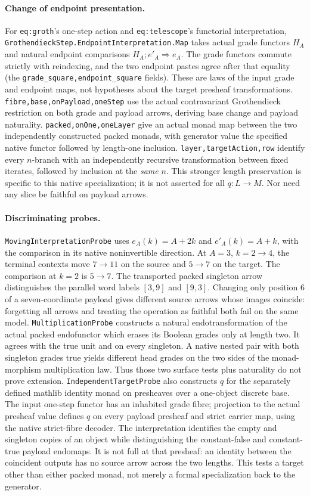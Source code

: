\paragraph{Change of endpoint presentation.}
For \texttt{eq:groth}'s one-step action and \texttt{eq:telescope}'s
functorial interpretation, \texttt{GrothendieckStep.EndpointInterpretation.Map}
takes actual grade functors $H_A$ and natural endpoint comparisons
$H_A;e'_A\Rightarrow e_A$. The grade functors commute strictly with
reindexing, and the two endpoint pastes agree after that equality
(the \texttt{grade\_square,endpoint\_square} fields). These are laws
of the input grade and endpoint maps, not hypotheses about the target
presheaf transformations. \texttt{fibre,base,onPayload,oneStep}
use the actual contravariant Grothendieck restriction on both grade
and payload arrows, deriving base change and payload naturality.
\texttt{packed,onOne,oneLayer} give an actual monad map between
the two independently constructed packed monads, with generator value
the specified native functor followed by length-one inclusion.
\texttt{layer,targetAction,row} identify every $n$-branch with an
independently recursive transformation between fixed iterates, followed
by inclusion at the \emph{same} $n$. This stronger length preservation
is specific to this native specialization; it is not asserted for all
$q:L\to M$. Nor need any slice be faithful on payload arrows.
\paragraph{Discriminating probes.}
\texttt{MovingInterpretationProbe} uses $e_A(k)=A+2k$ and
$e'_A(k)=A+k$, with the comparison in its native noninvertible
direction. At $A=3$, $k=2\to4$, the terminal contexts move
$7\to11$ on the source and $5\to7$ on the target. The comparison
at $k=2$ is $5\to7$. The transported packed singleton arrow
distinguishes the parallel word labels $[3,9]$ and $[9,3]$.
Changing only position $6$ of a seven-coordinate payload gives
different source arrows whose images coincide: forgetting all arrows
and treating the operation as faithful both fail on the same model.
\texttt{MultiplicationProbe} constructs a natural endotransformation of
the actual packed endofunctor which erases its Boolean grades only at
length two. It agrees with the true unit and on every singleton. A
native nested pair with both singleton grades true yields different
head grades on the two sides of the monad-morphism multiplication law.
Thus those two surface tests plus naturality do not prove extension.
\texttt{IndependentTargetProbe} also constructs $q$ for the separately
defined mathlib identity monad on presheaves over a one-object discrete
base. The input one-step functor has an inhabited grade fibre; projection
to the actual presheaf value defines $q$ on every payload presheaf and
strict carrier map, using the native strict-fibre decoder. The
interpretation identifies the empty and singleton copies of an object
while distinguishing the constant-false and constant-true payload
endomaps. It is not full at that presheaf: an identity between the
coincident outputs has no source arrow across the two lengths. This
tests a target other than either packed monad, not merely a formal
specialization back to the generator.
